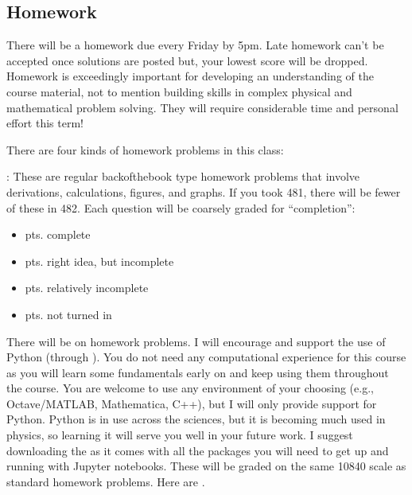 \documentclass[letterpaper,10pt,english]{jupyterBook}
\begin{document}
\subsection{Homework}
\label{\detokenize{content/0_course/design:homework}}
\sphinxAtStartPar
There will be a homework due every Friday by 5pm. Late homework can’t be accepted once solutions are posted \sphinxhyphen{} but, your lowest score will be dropped. Homework is exceedingly important for developing an understanding of the course material, not to mention building skills in complex physical and mathematical problem solving. They will require considerable time and personal effort this term! 

\sphinxAtStartPar
There are four kinds of homework problems in this class:

\sphinxAtStartPar
{}: These are regular back\sphinxhyphen{}of\sphinxhyphen{}the\sphinxhyphen{}book type homework problems that involve derivations, calculations, figures, and graphs. If you took 481, there will be fewer of these in 482. Each question will be coarsely graded for “completion”:
\begin{itemize}
\item {} 
 pts. complete

\item {} 
 pts. right idea, but incomplete

\item {} 
 pts. relatively incomplete

\item {} 
 pts. not turned in

\end{itemize}

\sphinxAtStartPar
{} There will be  on homework problems. I will encourage and support the use of Python (through ). You do not need any computational experience for this course as you will learn some fundamentals early on and keep using them throughout the course. You are welcome to use any environment of your choosing (e.g., Octave/MATLAB, Mathematica, C++), but I will only provide support for Python. Python is in use across the sciences, but it is becoming much used in physics, so learning it will serve you well in your future work. I suggest downloading the  as it comes with all the packages you will need to get up and running with Jupyter notebooks. These will be graded on the same 10\sphinxhyphen{}8\sphinxhyphen{}4\sphinxhyphen{}0 scale as standard homework problems. Here are .
\end{document}
